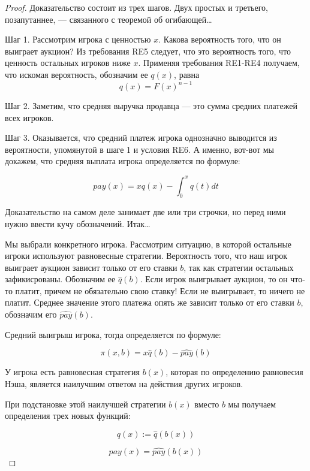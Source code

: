 \begin{proof}

Доказательство состоит из трех шагов. Двух простых и третьего, позапутаннее, --- связанного с теоремой об огибающей\ldots

Шаг 1. Рассмотрим игрока с ценностью $ x $. Какова вероятность того, что он выиграет аукцион? Из требования RE5 следует, что это вероятность того, что ценность остальных игроков ниже $ x $. Применяя требования RE1-RE4 получаем, что искомая вероятность, обозначим ее $ q(x) $, равна 
\[ q(x)=F(x)^{n-1} \]

Шаг 2. Заметим, что средняя выручка продавца --- это сумма средних платежей всех игроков.


Шаг 3. Оказывается, что средний платеж игрока однозначно выводится из вероятности, упомянутой в шаге 1 и условия RE6. А именно, вот-вот мы докажем, что средняя выплата игрока определяется по формуле:

\begin{equation}
\label{pay_eq}
pay(x)=xq(x)-\int_{0}^{x}q(t)dt 
\end{equation}

Доказательство на самом деле занимает две или три строчки, но перед ними нужно ввести кучу обозначений. Итак\ldots

Мы выбрали конкретного игрока. Рассмотрим ситуацию, в которой остальные игроки используют равновесные стратегии. Вероятность того, что наш игрок выиграет аукцион зависит только от его ставки $ b $, так как стратегии остальных зафикисрованы. Обозначим ее $ \widehat{q}(b) $. Если игрок выигрывает аукцион, то он что-то платит, причем не обязательно свою ставку! Если не выигрывает, то ничего не платит. Среднее значение этого платежа опять же зависит только от его ставки $ b $, обозначим его $ \widehat{pay}(b) $.

Средний выигрыш игрока, тогда определяется по формуле:

\begin{equation}
\pi(x,b)=x\widehat{q}(b)-\widehat{pay}(b)
\end{equation}

У игрока есть равновесная стратегия $ b(x) $, которая по определению равновесия Нэша, является наилучшим ответом на действия других игроков. 

При подстановке этой наилучшей стратегии  $ b(x) $ вместо $ b $ мы получаем определения трех новых функций:

\[ q(x):=\widehat{q}(b(x)) \]

\[ pay(x)=\widehat{pay}(b(x)) \]


\end{proof}
